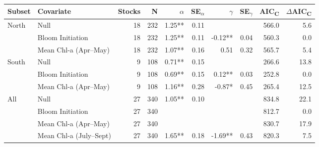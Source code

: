 \begin{tabular}{llrrrrrrrr}
  \hline
Subset & Covariate & Stocks & N & $\alpha$ & SE\textsubscript{$\alpha$} & $\gamma$ & SE\textsubscript{$\gamma$} & AIC\textsubscript{C} & $\Delta$AIC\textsubscript{C} \\ 
  \hline
North & Null & 18 & 232 & 1.25** & 0.11 &  &  & 566.0 & 5.6 \\ 
   & Bloom Initiation & 18 & 232 & 1.25** & 0.11 & -0.12** & 0.04 & 560.3 & 0.0 \\ 
   & Mean Chl-a (Apr--May) & 18 & 232 & 1.07** & 0.16 & 0.51 & 0.32 & 565.7 & 5.4 \\ 
  South & Null & 9 & 108 & 0.71** & 0.15 &  &  & 266.6 & 13.8 \\ 
   & Bloom Initiation & 9 & 108 & 0.69** & 0.15 & 0.12** & 0.03 & 252.8 & 0.0 \\ 
   & Mean Chl-a (Apr--May) & 9 & 108 & 1.16** & 0.28 & -0.87* & 0.45 & 265.4 & 12.5 \\ 
  All & Null & 27 & 340 & 1.05** & 0.10 &  &  & 834.8 & 22.1 \\ 
   & Bloom Initiation & 27 & 340 &  &  &  &  & 812.7 & 0.0 \\ 
   & Mean Chl-a (Apr--May) & 27 & 340 &  &  &  &  & 830.7 & 17.9 \\ 
   & Mean Chl-a (July--Sept) & 27 & 340 & 1.65** & 0.18 & -1.69** & 0.43 & 820.3 & 7.5 \\ 
   \hline
\end{tabular}
